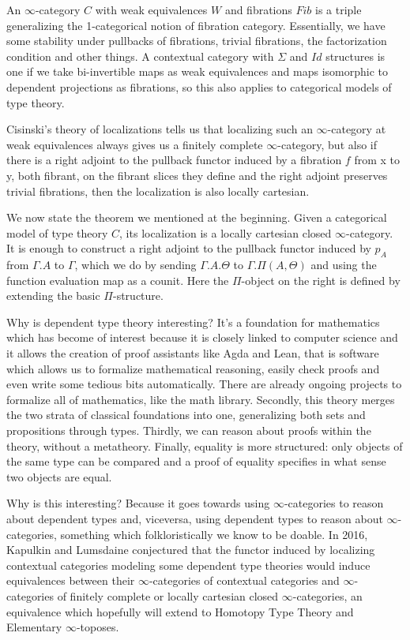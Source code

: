 \documentclass{minimal}
\newcommand{\Id}{Id}
\begin{document}
An $\infty$-category $C$ with weak equivalences $W$ and fibrations $Fib$ is a
triple generalizing the 1-categorical notion of fibration category. Essentially,
we have some stability under pullbacks of fibrations, trivial fibrations, the
factorization condition and other things. A contextual category with $\Sigma$
and $\Id$ structures is one if we take bi-invertible maps as weak equivalences
and maps isomorphic to dependent projections as fibrations, so this also applies
to categorical models of type theory.

Cisinski's theory of localizations tells us that localizing such an
$\infty$-category at weak equivalences always gives us a finitely complete
$\infty$-category, but also if there is a right adjoint to the pullback functor
induced by a fibration $f$ from x to y, both fibrant, on the fibrant slices they
define and the right adjoint preserves trivial fibrations, then the localization
is also locally cartesian.

We now state the theorem we mentioned at the beginning. Given a categorical
model of type theory $C$, its localization is a locally cartesian closed
$\infty$-category. It is enough to construct a right adjoint to the pullback
functor induced by $p_A$ from $\Gamma.A$ to $\Gamma$, which we do by sending
$\Gamma.A.\Theta$ to $\Gamma.\Pi(A,\Theta)$ and using the function evaluation
map as a counit. Here the $\Pi$-object on the right
is defined by extending the basic $\Pi$-structure.

Why is dependent type theory interesting? It's a foundation for mathematics
which has become of interest because it is closely linked to computer science
and it allows the creation of proof assistants like Agda and Lean, that is
software which allows us to formalize mathematical reasoning, easily check
proofs and even write some tedious bits automatically. There are already ongoing
projects to formalize all of mathematics, like the math library. Secondly, this
theory merges the two strata of classical foundations into one, generalizing
both sets and propositions through types. Thirdly, we can reason about proofs
within the theory, without a metatheory. Finally, equality is more structured:
only objects of the same type can be compared and a proof of equality specifies
in what sense two objects are equal.

Why is this interesting? Because it goes towards using $\infty$-categories to
reason about dependent types and, viceversa, using dependent types to reason
about $\infty$-categories, something which folkloristically we know to be
doable. In 2016, Kapulkin and Lumsdaine conjectured that the functor induced by
localizing contextual categories modeling some dependent type theories
would induce equivalences between their $\infty$-categories of contextual
categories and $\infty$-categories of finitely complete or locally cartesian
closed $\infty$-categories, an equivalence which hopefully will extend to
Homotopy Type Theory and Elementary $\infty$-toposes.
\end{document}
